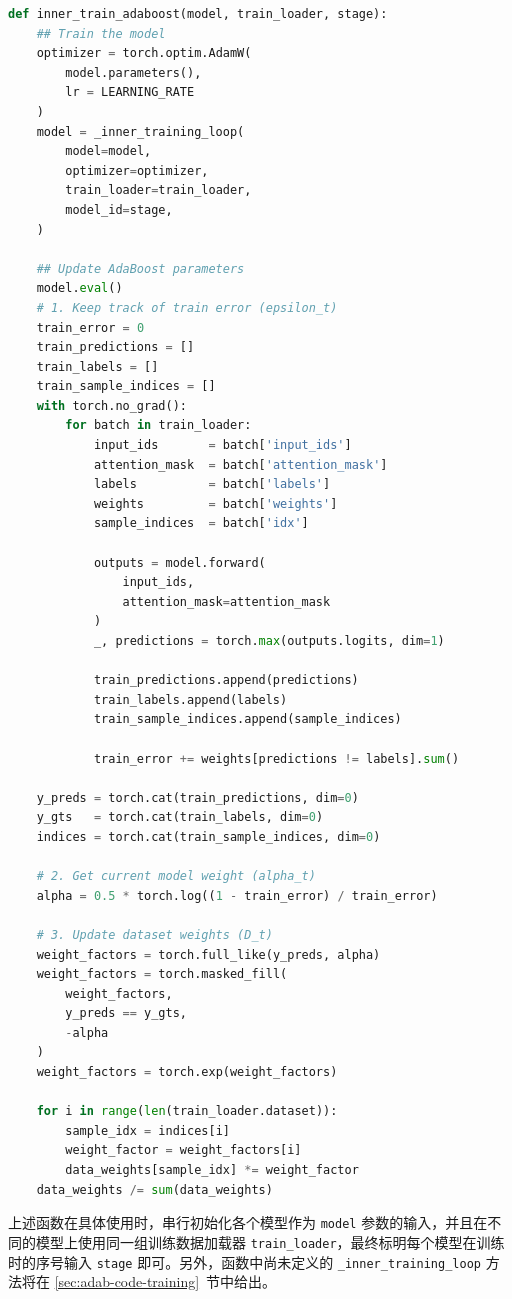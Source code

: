 \documentclass[12pt, a4paper, UTF8]{ctexart}
\begin{document}
\begin{small}
\begin{lstlisting}[language=Python]
def inner_train_adaboost(model, train_loader, stage):
    ## Train the model
    optimizer = torch.optim.AdamW(
        model.parameters(),
        lr = LEARNING_RATE
    )
    model = _inner_training_loop(
        model=model,
        optimizer=optimizer,
        train_loader=train_loader,
        model_id=stage,
    )

    ## Update AdaBoost parameters
    model.eval()
    # 1. Keep track of train error (epsilon_t)
    train_error = 0
    train_predictions = []
    train_labels = []
    train_sample_indices = []
    with torch.no_grad():
        for batch in train_loader:
            input_ids       = batch['input_ids']
            attention_mask  = batch['attention_mask']
            labels          = batch['labels']
            weights         = batch['weights']
            sample_indices  = batch['idx']
            
            outputs = model.forward(
                input_ids,
                attention_mask=attention_mask
            )
            _, predictions = torch.max(outputs.logits, dim=1)

            train_predictions.append(predictions)
            train_labels.append(labels)
            train_sample_indices.append(sample_indices)

            train_error += weights[predictions != labels].sum()

    y_preds = torch.cat(train_predictions, dim=0)
    y_gts   = torch.cat(train_labels, dim=0)
    indices = torch.cat(train_sample_indices, dim=0)

    # 2. Get current model weight (alpha_t)
    alpha = 0.5 * torch.log((1 - train_error) / train_error)

    # 3. Update dataset weights (D_t)
    weight_factors = torch.full_like(y_preds, alpha)
    weight_factors = torch.masked_fill(
        weight_factors,
        y_preds == y_gts,
        -alpha
    )
    weight_factors = torch.exp(weight_factors)

    for i in range(len(train_loader.dataset)):
        sample_idx = indices[i]
        weight_factor = weight_factors[i]
        data_weights[sample_idx] *= weight_factor
    data_weights /= sum(data_weights)
\end{lstlisting}
\end{small}

上述函数在具体使用时，串行初始化各个模型作为 \verb|model| 参数的输入，并且在不同的模型上使用同一组训练数据加载器 \verb|train_loader|，最终标明每个模型在训练时的序号输入 \verb|stage| 即可。另外，函数中尚未定义的 \verb|_inner_training_loop| 方法将在 \ref{sec:adab-code-training}~节中给出。
\end{document}

